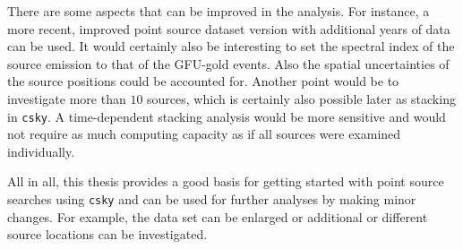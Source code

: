 There are some aspects that can be improved in the analysis.
For instance, a more recent, improved point source dataset version with additional years of data can be used.
It would certainly also be interesting to set the spectral index of the source emission to that of the GFU-gold events.
Also the spatial uncertainties of the source positions could be accounted for.
Another point would be to investigate more than $\num{10}$ sources, which is certainly also possible later as stacking in \texttt{csky}.
A time-dependent stacking analysis would be more sensitive and would not require as much computing capacity as if all sources were examined individually.

All in all, this thesis provides a good basis for getting started with point source searches using \texttt{csky} and can be used for further analyses by making minor changes.
For example, the data set can be enlarged or additional or different source locations can be investigated.


